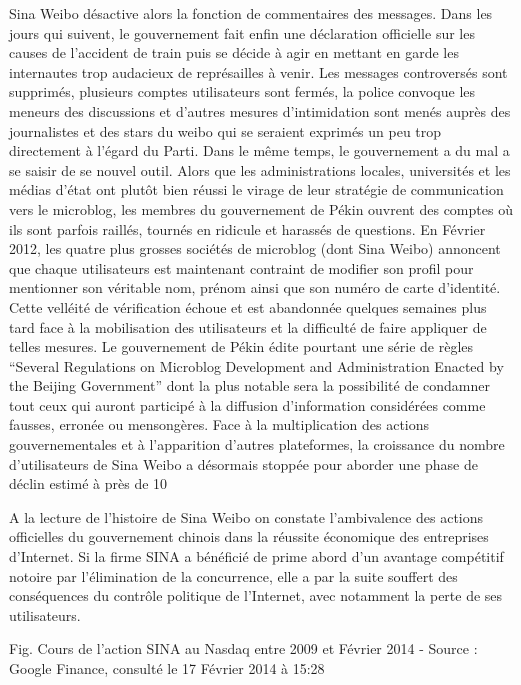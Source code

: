 Sina Weibo désactive alors la fonction de commentaires des messages. Dans les jours qui suivent, le gouvernement fait enfin une déclaration officielle sur les causes de l’accident de train puis se décide à agir en mettant en garde les internautes trop audacieux de représailles à venir. Les messages controversés sont supprimés, plusieurs comptes utilisateurs sont fermés, la police convoque les meneurs des discussions et d’autres mesures d’intimidation sont menés auprès des journalistes et des stars du weibo qui se seraient exprimés un peu trop directement à l’égard du Parti. Dans le même temps, le gouvernement a du mal a se saisir de se nouvel outil. Alors que les administrations locales, universités et les médias d’état ont plutôt bien réussi le virage de leur stratégie de communication vers le microblog, les membres du gouvernement de Pékin ouvrent des comptes où ils sont parfois raillés, tournés en ridicule et harassés de questions. En Février 2012, les quatre plus grosses sociétés de microblog (dont Sina Weibo) annoncent que chaque utilisateurs est maintenant contraint de modifier son profil pour mentionner son véritable nom, prénom ainsi que son numéro de carte d’identité. Cette velléité de vérification échoue et est abandonnée quelques semaines plus tard face à la mobilisation des utilisateurs et la difficulté de faire appliquer de telles mesures. Le gouvernement de Pékin édite pourtant une série de règles “Several Regulations on Microblog Development and Administration Enacted by the Beijing Government” dont la plus notable sera la possibilité de condamner tout ceux qui auront participé à la diffusion d’information considérées comme fausses, erronée ou mensongères. Face à la multiplication des actions gouvernementales et à l’apparition d’autres plateformes, la croissance du nombre d’utilisateurs de Sina Weibo a désormais stoppée pour aborder une phase de déclin estimé à près de 10%

A la lecture de l’histoire de Sina Weibo on constate l’ambivalence des actions officielles du gouvernement chinois dans la réussite économique des entreprises d’Internet. Si la firme SINA a bénéficié de prime abord d’un avantage compétitif notoire par l’élimination de la concurrence, elle a par la suite souffert des conséquences du contrôle politique de l’Internet, avec notamment la perte de ses utilisateurs.


Fig. Cours de l’action SINA au Nasdaq entre 2009 et Février 2014 - 
Source : Google Finance, consulté le 17 Février 2014 à 15:28 

